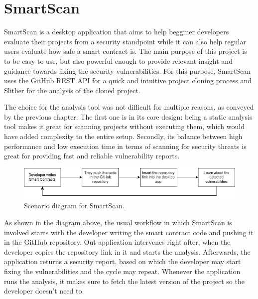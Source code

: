 \chapter{SmartScan}

SmartScan \cite{smartScan} is a desktop application that aims to help begginer developers evaluate their projects from a security standpoint while it can also help regular users evaluate how safe a smart contract is. The main purpose of this project is to be easy to use, but also powerful enough to provide relevant insight and guidance towards fixing the security vulnerabilities. For this purpose, SmartScan uses the GitHub REST API \cite{gitHubRestAPI} for a quick and intuitive project cloning process and Slither \cite{slitherGitHub} for the analysis of the cloned project.

The choice for the analysis tool was not difficult for multiple reasons, as conveyed by the previous chapter. The first one is in its core design: being a static analysis tool makes it great for scanning projects without executing them, which would have added complexity to the entire setup. Secondly, its balance between high performance and low execution time in terms of scanning for security threats is great for providing fast and reliable vulnerability reports.

\begin{figure}[h]
    \centering
    \includegraphics[width=1\linewidth]{images/scenario-diagram.png}
    \caption{Scenario diagram for SmartScan.}
    \label{fig:enter-label}
\end{figure}

As shown in the diagram above, the usual workflow in which SmartScan is involved starts with the developer writing the smart contract code and pushing it in the GitHub repository. Out application intervenes right after, when the developer copies the repository link in it and starts the analysis. Afterwards, the application returns a security report, based on which the developer may start fixing the vulnerabilities and the cycle may repeat. Whenever the application runs the analysis, it makes sure to fetch the latest version of the project so the developer doesn't need to.

